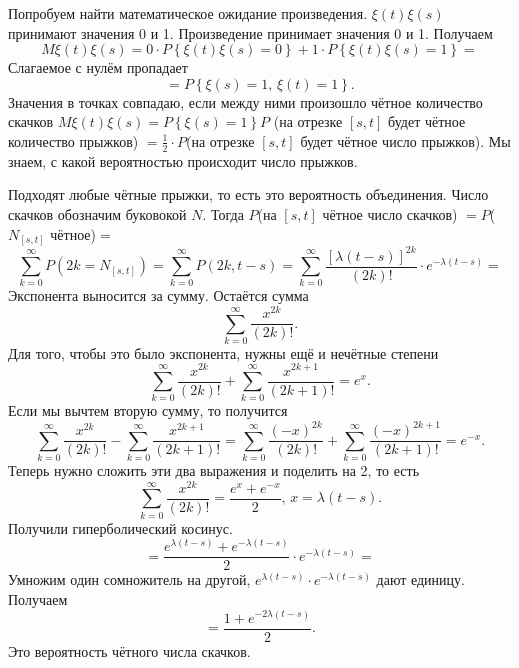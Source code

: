 Попробуем найти математическое ожидание произведения.
$ \xi \left( t \right) \xi \left( s \right) $ принимают значения 0 и 1.
Произведение принимает значения 0 и 1.
Получаем
$$M \xi \left( t \right) \xi \left( s \right) =
  0 \cdot P \left\{ \xi \left( t \right) \xi \left( s \right) = 0 \right\} +
  1 \cdot P \left\{ \xi \left( t \right) \xi \left( s \right) = 1 \right\} =$$
Слагаемое с нулём пропадает
$$= P \left\{ \xi \left( s \right) = 1, \, \xi \left( t \right) = 1 \right\}.$$
Значения в точках совпадаю, если между ними произошло чётное количество скачков
$M \xi \left( t \right) \xi \left( s \right) = P \left\{ \xi \left( s \right) = 1 \right\} P$
(на отрезке $ \left[ s, t \right] $ будет чётное количество прыжков)
$= \frac{1}{2} \cdot P$(на отрезке $ \left[ s, t \right] $ будет чётное число прыжков).
Мы знаем, с какой вероятностью происходит число прыжков.

Подходят любые чётные прыжки, то есть это вероятность объединения.
Число скачков обозначим буковокой $N$.
Тогда $P$(на $ \left[ s, t \right] $ чётное число скачков)
$= P$($N_{ \left[ s, t \right] }$ чётное)$=$
$$ \sum \limits_{k = 0}^{ \infty } P \left( 2k = N_{ \left[ s, t \right] } \right) =
  \sum \limits_{k = 0}^{ \infty } P \left( 2k, t - s \right) =
  \sum \limits_{k = 0}^{ \infty }
    \frac{ \left[ \lambda \left( t - s \right) \right]^{2k}}{ \left( 2k \right)!} \cdot
    e^{-\lambda \left( t - s \right) } =$$
Экспонента выносится за сумму.
Остаётся сумма
$$ \sum \limits_{k = 0}^{ \infty } \frac{x^{2k}}{ \left( 2k \right)!}.$$
Для того, чтобы это было экспонента, нужны ещё и нечётные степени
$$ \sum \limits_{k = 0}^{ \infty } \frac{x^{2k}}{ \left( 2k \right)!} +
  \sum \limits_{k = 0}^{ \infty } \frac{x^{2k + 1}}{ \left( 2k + 1 \right)!} =
  e^x.$$
Если мы вычтем вторую сумму, то получится
$$ \sum \limits_{k = 0}^{ \infty } \frac{x^{2k}}{ \left( 2k \right)!} -
  \sum \limits_{k = 0}^{ \infty } \frac{x^{2k + 1}}{ \left( 2k + 1 \right)!} =
  \sum \limits_{k = 0}^{ \infty } \frac{ \left( -x \right)^{2k}}{ \left( 2k \right)!} +
  \sum \limits_{k = 0}^{ \infty } \frac{ \left( -x \right)^{2k + 1}}{ \left( 2k + 1 \right)!} =
  e^{-x}.$$
Теперь нужно сложить эти два выражения и поделить на 2, то есть
$$ \sum \limits_{k = 0}^{ \infty } \frac{x^{2k}}{ \left( 2k \right)!} =
  \frac{e^x + e^{-x}}{2}, \,
  x = \lambda \left( t - s \right).$$
Получили гиперболический косинус.
$$= \frac{e^{ \lambda \left( t - s \right) } +
  e^{-\lambda \left( t- s \right) }}{2} \cdot e^{-\lambda \left( t - s \right) } =$$
Умножим один сомножитель на другой,
$e^{ \lambda \left( t - s \right) } \cdot e^{-\lambda \left( t -s \right) }$ дают единицу.
Получаем
$$= \frac{1 + e^{-2 \lambda \left( t - s \right) }}{2}.$$
Это вероятность чётного числа скачков.

